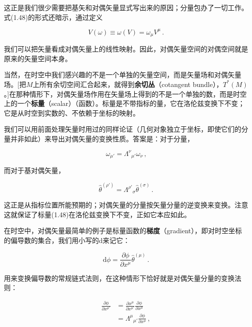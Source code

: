 这正是我们很少需要把基矢和对偶矢量显式写出来的原因；分量包办了一切工作。式(1.48)的形式还暗示，通过定义

\begin{equation*}
V(\omega)\equiv\omega(V)=\omega_{\mu}V^{\mu}\,.
\tag{1.49}
\end{equation*}

我们可以把矢量看成对偶矢量上的线性映射。因此，对偶矢量空间的对偶空间就是原来的矢量空间本身。

当然，在时空中我们感兴趣的不是一个单独的矢量空间，而是矢量场和对偶矢量场。[把$M$上所有余切空间汇合起来，就得到\textbf{余切丛}（cotangent bundle），$T^{*}(M)$。]在那种情形下，对偶矢量场作用在矢量场上得到的不是一个单独的数，而是时空上的一个\textbf{标量}（scalar）（函数）。标量是不带指标的量，它在洛伦兹变换下不变；它是从时空到实数的、不依赖于坐标的映射。

我们可以用前面处理矢量时用过的同样论证（几何对象独立于坐标，即使它们的分量并非如此）来导出对偶矢量的变换性质。答案是：对于分量，

\begin{equation*}
\boxed{\,\omega_{\mu'}=\Lambda^{\nu}{}_{\mu'}\omega_{\nu}\,,}
\tag{1.50}
\end{equation*}

而对于基对偶矢量，

\begin{equation*}
\hat{\theta}^{(\rho')}=\Lambda^{\rho'}{}_{\sigma}\hat{\theta}^{(\sigma)}\,.
\tag{1.51}
\end{equation*}

这正是从指标位置所能预期的；对偶矢量的分量按矢量分量的逆变换来变换。注意这就保证了标量(1.48)在洛伦兹变换下不变，正如它本应如此。

在时空中，对偶矢量最简单的例子是标量函数的\textbf{梯度}（gradient），即对时空坐标的偏导数的集合，我们用小写的d来记它：

\begin{equation*}
\mathrm{d}\phi=\frac{\partial\phi}{\partial x^{\mu}}\hat{\theta}^{(\mu)}\,.
\tag{1.52}
\end{equation*}

用来变换偏导数的常规链式法则，在这种情形下恰好就是对偶矢量分量的变换法则：

\begin{align*}
\frac{\partial\phi}{\partial x^{\mu'}}&=\frac{\partial x^{\mu}}{\partial x^{\mu'}}\frac{\partial\phi}{\partial x^{\mu}}\\
&=\Lambda^{\mu}{}_{\mu'}\frac{\partial\phi}{\partial x^{\mu}}\,,
\tag{1.53}
\end{align*}

